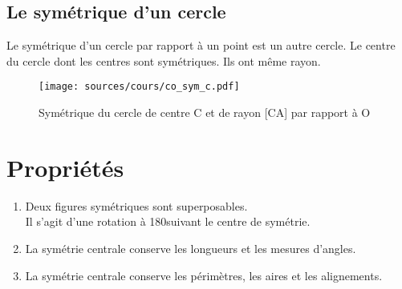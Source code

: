 \documentclass[paper=a4, fontsize=10pt]{scrartcl} %
\begin{document}
\subsection{Le symétrique d'un cercle}
Le symétrique d'un cercle par rapport à un point est un autre cercle. Le centre du cercle dont les centres sont symétriques. Ils ont même rayon.

\begin{figure}[H]
  \centering
  \texttt{[image: sources/cours/co\_sym\_c.pdf]}
  \caption{Symétrique du cercle de centre C et de rayon [CA] par rapport à O}
  \label{fig:ch2-symc}
\end{figure}

\section{Propriétés}

\begin{enumerate}
\item Deux figures symétriques sont superposables.\\
  Il s'agit d'une rotation à 180\degre suivant le centre de symétrie.\\
\item La symétrie centrale conserve les longueurs et les mesures d'angles.\\
\item La symétrie centrale conserve les périmètres, les aires et les alignements.\\
\end{enumerate}
\end{document}
